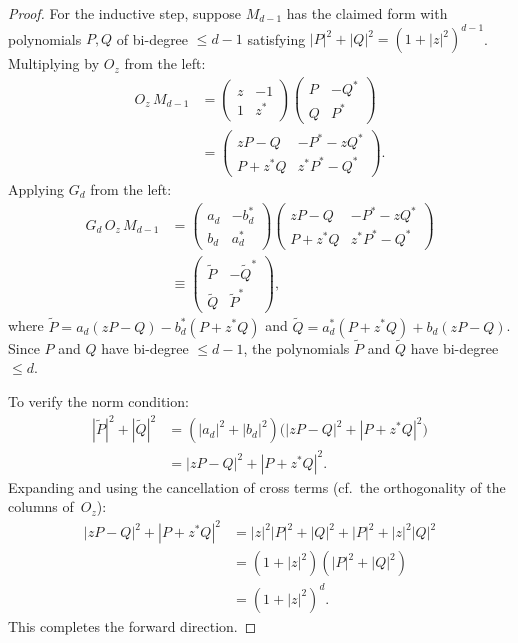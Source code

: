 \begin{proof}
	For the inductive step, suppose $M_{d-1}$ has the
	claimed form with polynomials $P, Q$ of bi-degree
	$\leq d-1$ satisfying
	$|P|^2 + |Q|^2 = (1+|z|^2)^{d-1}$.  Multiplying by
	$O_z$ from the left:
	\begin{align}
		O_z\,M_{d-1}
		&= \begin{pmatrix} z & -1 \\ 1 & z^* \end{pmatrix}
		\begin{pmatrix} P & -Q^* \\ Q & P^* \end{pmatrix}
		\nonumber\\
		&= \begin{pmatrix} zP - Q & -P^* - zQ^* \\
			P + z^*Q & z^*P^* - Q^* \end{pmatrix}.
		\tag{A23}
	\end{align}
	Applying $G_d$ from the left:
	\begin{align}
		G_d\,O_z\,M_{d-1}
		 & = \begin{pmatrix} a_d & -b_d^* \\
			     b_d & a_d^* \end{pmatrix}
		\begin{pmatrix} zP - Q & -P^* - zQ^* \\
			P + z^*Q & z^*P^* - Q^* \end{pmatrix}
		\nonumber                                                    \\
		 & \equiv \begin{pmatrix} \widetilde{P} & -\widetilde{Q}^* \\
			           \widetilde{Q} & \widetilde{P}^* \end{pmatrix},
		\tag{A24}
	\end{align}
	where
	$\widetilde{P} = a_d(zP - Q) - b_d^*(P + z^*Q)$ and
	$\widetilde{Q} = a_d^*(P + z^*Q) + b_d(zP - Q)$.
	Since $P$ and $Q$ have bi-degree $\leq d-1$,
	the polynomials $\widetilde{P}$ and $\widetilde{Q}$
	have bi-degree $\leq d$.

	To verify the norm condition:
	\begin{align}
		|\widetilde{P}|^2 + |\widetilde{Q}|^2
		 & = (|a_d|^2 + |b_d|^2)\bigl(|zP - Q|^2 + |P + z^*Q|^2\bigr)
		\nonumber                                                        \\
		 & = |zP - Q|^2 + |P + z^*Q|^2.
		\tag{A25}
	\end{align}
	Expanding and using the cancellation of cross terms
	(cf.\ the orthogonality of the columns of~$O_z$):
	\begin{align}
		|zP - Q|^2 + |P + z^*Q|^2
		 & = |z|^2|P|^2 + |Q|^2 + |P|^2 + |z|^2|Q|^2
		\nonumber                                       \\
		 & = (1 + |z|^2)(|P|^2 + |Q|^2)
		\nonumber                                       \\
		 & = (1 + |z|^2)^d.
		\tag{A26}
	\end{align}
	This completes the forward direction.


\end{proof}
